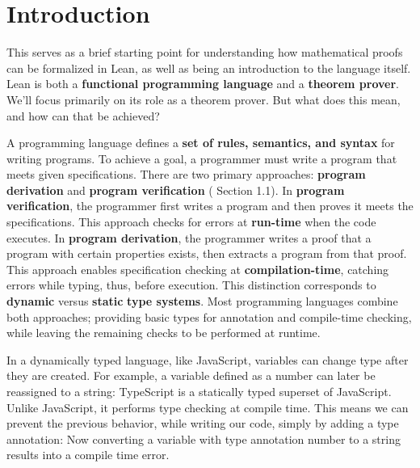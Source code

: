 \section{Introduction}
This serves as a brief starting point for understanding how mathematical proofs can be
formalized in Lean, as well as being an introduction to the language itself.
Lean is both a \textbf{functional programming language} and a \textbf{theorem prover}.
We'll focus primarily on its role as a theorem prover.
But what does this mean, and how can that be achieved?

A programming language defines a \textbf{set of rules, semantics, and syntax} for writing programs.
To achieve a goal, a programmer must write a program that meets given specifications.
There are two primary approaches: \textbf{program derivation} and \textbf{program verification}
(\cite{nordstrom1990programming} Section 1.1).
In \textbf{program verification}, the programmer first writes a program and then proves it meets
the specifications. This approach checks for errors at \textbf{run-time} when the code executes.
In \textbf{program derivation}, the programmer writes a proof that a program with certain properties exists,
then extracts a program from that proof. This approach enables specification
checking at \textbf{compilation-time}, catching errors while typing, thus, before execution.
This distinction corresponds to \textbf{dynamic} versus \textbf{static} \textbf{type systems}.
Most programming languages combine both approaches; providing basic types for annotation and compile-time checking,
while leaving the remaining checks to be performed at runtime.

\begin{example}
  In a dynamically typed language, like JavaScript, variables can change type after
  they are created. For example, a variable defined as a number can later
  be reassigned to a string:
  TypeScript is a statically typed superset of JavaScript.
  Unlike JavaScript, it performs type checking at compile time.
  This means we can prevent the previous behavior, while writing our code, simply by adding
  a type annotation:
  Now converting a variable with type annotation number to a string results into a compile time error.
\end{example}

